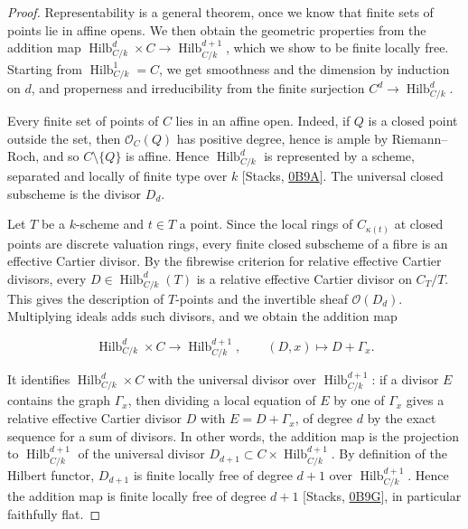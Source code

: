 \documentclass[11pt]{article}
\begin{document}
\begin{proof}[{Proof}]\label{bp140}%
Representability is a general theorem, once we know that finite sets of points lie in affine opens. We then obtain the geometric properties from the addition map \(\operatorname{Hilb}^{d}_{C/k}\times C\to \operatorname{Hilb}^{d+1}_{C/k}\), which we show to be finite locally free. Starting from \(\operatorname{Hilb}^{1}_{C/k}=C\), we get smoothness and the dimension by induction on \(d\), and properness and irreducibility from the finite surjection \(C^d\to \operatorname{Hilb}^{d}_{C/k}\).

Every finite set of points of \(C\) lies in an affine open. Indeed, if \(Q\) is a closed point outside the set, then \(\mathcal O_C(Q)\) has positive degree, hence is ample by Riemann–Roch, and so \(C\setminus\{Q\}\) is affine. Hence \(\operatorname{Hilb}^{d}_{C/k}\) is represented by a scheme, separated and locally of finite type over \(k\) [Stacks, \href{https://stacks.math.columbia.edu/tag/0B9A}{0B9A}]. The universal closed subscheme is the divisor \(D_d\).

Let \(T\) be a \(k\)-scheme and \(t\in T\) a point. Since the local rings of \(C_{\kappa(t)}\) at closed points are discrete valuation rings, every finite closed subscheme of a fibre is an effective Cartier divisor. By the fibrewise criterion for relative effective Cartier divisors, every \(D\in \operatorname{Hilb}^{d}_{C/k}(T)\) is a relative effective Cartier divisor on \(C_T/T\). This gives the description of \(T\)-points and the invertible sheaf \(\mathcal O(D_d)\). Multiplying ideals adds such divisors, and we obtain the addition map

\[
\operatorname{Hilb}^{d}_{C/k}\times C\longrightarrow \operatorname{Hilb}^{d+1}_{C/k},\qquad (D,x)\longmapsto D+\Gamma_x.
\]

It identifies \(\operatorname{Hilb}^{d}_{C/k}\times C\) with the universal divisor over \(\operatorname{Hilb}^{d+1}_{C/k}\): if a divisor \(E\) contains the graph \(\Gamma_x\), then dividing a local equation of \(E\) by one of \(\Gamma_x\) gives a relative effective Cartier divisor \(D\) with \(E=D+\Gamma_x\), of degree \(d\) by the exact sequence for a sum of divisors. In other words, the addition map is the projection to \(\operatorname{Hilb}^{d+1}_{C/k}\) of the universal divisor \(D_{d+1}\subset C\times \operatorname{Hilb}^{d+1}_{C/k}\). By definition of the Hilbert functor, \(D_{d+1}\) is finite locally free of degree \(d+1\) over \(\operatorname{Hilb}^{d+1}_{C/k}\). Hence the addition map is finite locally free of degree \(d+1\) [Stacks, \href{https://stacks.math.columbia.edu/tag/0B9G}{0B9G}], in particular faithfully flat.


\end{proof}
\end{document}
